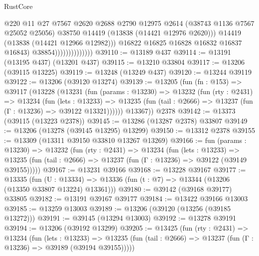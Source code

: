 \begin{lexlean}{RustCore}
\begin{coremodule}
                                      @220
                                      @11
                                      @27
                                      @7567
                                      @2620
                                      @2688
                                      @2790
                                      @12975
                                      @2614
                                      (@38743 @1136 @7567 @25052 @25056)
                                      @38750
                                      @14419
                                      (@13838 (@14421 @12976 @2620)))
                                    @14419
                                    (@13838 (@14421 @12966 @12982)))
                                  @16822
                                  @16825
                                  @16828
                                  @16832
                                  @16837
                                  @16843)
                                @38854))))))))))))))
@39110 := @13189 @437
@39114 := @13191 (@13195 @437) (@13201 @437)
@39115 := @13210 @33804
@39117 := @13206 (@39115 @13225)
@39119 := @13248 (@13249 @437)
@39120 := @13244 @39119
@39122 := @13206 (@39120 @13274)
@39139 := @13205
    (fun (fn : @153) =>
    @39117
      (@13228
        (@13231
          (fun (params : @13230) =>
          @13232
            (fun (rty : @2431) =>
            @13234
              (fun (lets : @13233) =>
              @13235 (fun (tail : @2666) => @13237 (fun (Γ : @13236) => @39122 @13321))))))
        @13367))
    @2378
@39142 := @13373 (@39115 (@13223 @2378))
@39145 := @13286 (@13287 @2378) @33807
@39149 := @13206 (@13278 (@39145 @13295) @13299)
@39150 := @13312 @2378
@39155 := @13309 (@13311 @39150 @33810 @13267 @13269)
@39166 := fun (params : @13230) =>
  @13232
    (fun (rty : @2431) =>
    @13234
      (fun (lets : @13233) =>
      @13235 (fun (tail : @2666) => @13237 (fun (Γ : @13236) => @39122 (@39149 @39155)))))
@39167 := @13231 @39166
@39168 := @13228 @39167
@39177 := @13335
    (fun (U : @13334) => @13336 (fun (t : @7) => @13344 (@13206 (@13350 @33807 @13224) @13361)))
@39180 := @39142 (@39168 @39177) @33805
@39182 := @13191 @39167 @39177
@39184 := @13422 @39166 @13003
@39185 := @13259 @13003
@39189 := @13206 (@39120 (@13256 (@39185 @13272)))
@39191 := @39145 (@13294 @13003)
@39192 := @13278 @39191
@39194 := @13206 (@39192 @13299)
@39205 := @13425
    (fun (rty : @2431) =>
    @13234
      (fun (lets : @13233) =>
      @13235 (fun (tail : @2666) => @13237 (fun (Γ : @13236) => @39189 (@39194 @39155)))))

\end{coremodule}
\end{lexlean}
